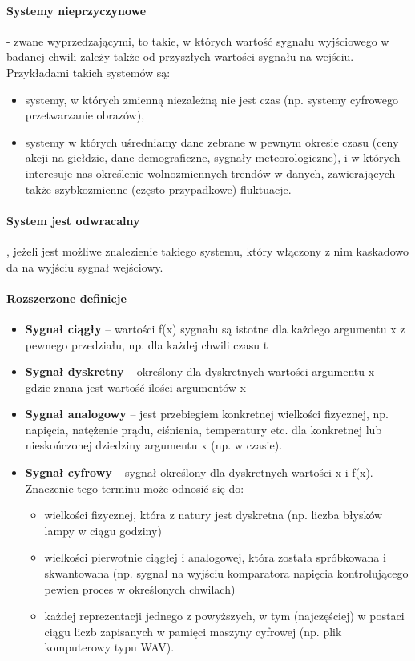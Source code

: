 \documentclass[a4paper,twoside]{report}
\begin{document}
\paragraph{Systemy nieprzyczynowe} - zwane wyprzedzającymi, to takie, w których wartość sygnału wyjściowego w badanej chwili zależy także od przyszłych wartości sygnału na wejściu. Przykładami takich systemów są:
\begin{itemize}
\item systemy, w których zmienną niezależną nie jest czas (np. systemy cyfrowego przetwarzanie obrazów),
\item systemy w których uśredniamy dane zebrane w pewnym okresie czasu (ceny akcji na giełdzie, dane demograficzne, sygnały meteorologiczne), i w których interesuje nas określenie wolnozmiennych trendów w danych, zawierających także szybkozmienne (często przypadkowe) fluktuacje.
\end{itemize}


\paragraph{System jest odwracalny}, jeżeli jest możliwe znalezienie takiego systemu, który włączony z nim kaskadowo da na wyjściu sygnał wejściowy.

\paragraph{Rozszerzone definicje}
\begin{itemize}
\item \textbf{Sygnał ciągły} – wartości f(x) sygnału są istotne dla każdego argumentu x z pewnego przedziału, np. dla każdej chwili czasu t 
\item \textbf{Sygnał dyskretny} – określony dla dyskretnych wartości argumentu x – gdzie znana jest wartość ilości argumentów x 
\item \textbf{Sygnał analogowy} – jest przebiegiem konkretnej wielkości fizycznej, np. napięcia, natężenie prądu, ciśnienia, temperatury etc. dla konkretnej lub nieskończonej dziedziny argumentu x (np. w czasie). 
\item \textbf{Sygnał cyfrowy} – sygnał określony dla dyskretnych wartości x i f(x). Znaczenie tego terminu może odnosić się do: 
\begin{itemize}
\item wielkości fizycznej, która z natury jest dyskretna (np. liczba błysków lampy w ciągu godziny) 
\item wielkości pierwotnie ciągłej i analogowej, która została spróbkowana i skwantowana (np. sygnał na wyjściu komparatora napięcia kontrolującego pewien proces w określonych chwilach) 
\item każdej reprezentacji jednego z powyższych, w tym (najczęściej) w postaci ciągu liczb zapisanych w pamięci maszyny cyfrowej (np. plik komputerowy typu WAV). 
\end{itemize}
\end{itemize}
\end{document}
